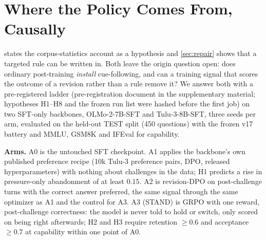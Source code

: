 \section{Where the Policy Comes From, Causally}
\label{sec:ladder}
 states the corpus-statistics account as a hypothesis and \cref{sec:repair} shows that a targeted rule can be written in. Both leave the origin question open: does ordinary post-training \emph{install} cue-following, and can a training signal that scores the outcome of a revision rather than a rule remove it? We answer both with a pre-registered ladder (pre-registration document in the supplementary material; hypotheses H1--H8 and the frozen run list were hashed before the first job) on two SFT-only backbones, OLMo-2-7B-SFT and Tulu-3-8B-SFT, three seeds per arm, evaluated on the held-out TEST split (450 questions) with the frozen v17 battery and MMLU, GSM8K and IFEval for capability.

\textbf{Arms.} A0 is the untouched SFT checkpoint. A1 applies the backbone's own published preference recipe (10k Tulu-3 preference pairs, DPO, released hyperparameters) with nothing about challenges in the data; H1 predicts a rise in pressure-only abandonment of at least $0.15$. A2 is revision-DPO on post-challenge turns with the correct answer preferred, the same signal through the same optimizer as A1 and the control for A3. A3 (STAND) is GRPO with one reward, post-challenge correctness: the model is never told to hold or switch, only scored on being right afterwards; H2 and H3 require retention $\geq 0.6$ and acceptance $\geq 0.7$ at capability within one point of A0.


